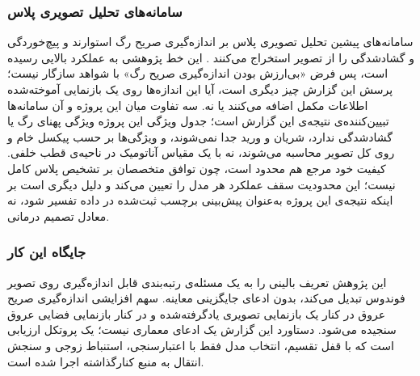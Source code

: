 \subsubsection{سامانه‌های تحلیل تصویری پلاس}

سامانه‌های پیشین تحلیل تصویری پلاس بر اندازه‌گیری صریح رگ استوارند و پیچ‌خوردگی و گشادشدگی را از تصویر استخراج می‌کنند \cite{wittenberg2011,yildiz2020}. این خط پژوهشی به عملکرد بالایی رسیده است، پس فرض «بی‌ارزش بودن اندازه‌گیری صریح رگ» با شواهد سازگار نیست؛ پرسش این گزارش چیز دیگری است، آیا این اندازه‌ها روی یک بازنمایی آموخته‌شده اطلاعات مکمل اضافه می‌کنند یا نه. سه تفاوت میان این پروژه و آن سامانه‌ها تبیین‌کننده‌ی نتیجه‌ی این گزارش است؛ جدول ویژگی این پروژه ویژگی پهنای رگ یا گشادشدگی ندارد، شریان و ورید جدا نمی‌شوند، و ویژگی‌ها بر حسب پیکسل خام و روی کل تصویر محاسبه می‌شوند، نه با یک مقیاس آناتومیک در ناحیه‌ی قطب خلفی. کیفیت خود مرجع هم محدود است، چون توافق متخصصان بر تشخیص پلاس کامل نیست؛ این محدودیت سقف عملکرد هر مدل را تعیین می‌کند و دلیل دیگری است بر اینکه نتیجه‌ی این پروژه به‌عنوان پیش‌بینی برچسب ثبت‌شده در داده تفسیر شود، نه معادل تصمیم درمانی.

\subsubsection{جایگاه این کار}

این پژوهش تعریف بالینی  را به یک مسئله‌ی رتبه‌بندی قابل اندازه‌گیری روی تصویر فوندوس تبدیل می‌کند، بدون ادعای جایگزینی معاینه. سهم افزایشی اندازه‌گیری صریح عروق در کنار یک بازنمایی تصویری یادگرفته‌شده و در کنار بازنمایی فضایی عروق سنجیده می‌شود. دستاورد این گزارش یک ادعای معماری نیست؛ یک پروتکل ارزیابی است که با قفل تقسیم، انتخاب مدل فقط با اعتبارسنجی، استنباط زوجی و سنجش انتقال به منبع کنارگذاشته اجرا شده است.
